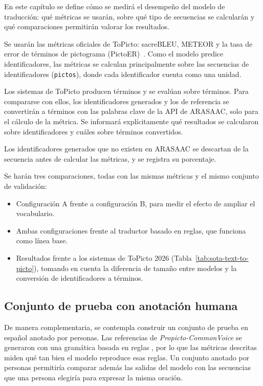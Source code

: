 En este capítulo se define cómo se medirá el desempeño del modelo de traducción: qué métricas se usarán, sobre qué tipo de secuencias se calcularán y qué comparaciones permitirán valorar los resultados.

Se usarán las métricas oficiales de ToPicto: sacreBLEU, METEOR y la tasa de error de términos de pictograma (PictoER)~\citep{Hjuler2026}. Como el modelo predice identificadores, las métricas se calculan principalmente sobre las secuencias de identificadores (\texttt{pictos}), donde cada identificador cuenta como una unidad.

Los sistemas de ToPicto producen términos y se evalúan sobre términos. Para compararse con ellos, los identificadores generados y los de referencia se convertirán a términos con las palabras clave de la API de ARASAAC, solo para el cálculo de la métrica. Se informará explícitamente qué resultados se calcularon sobre identificadores y cuáles sobre términos convertidos.

Los identificadores generados que no existen en ARASAAC se descartan de la secuencia antes de calcular las métricas, y se registra su porcentaje.

Se harán tres comparaciones, todas con las mismas métricas y el mismo conjunto de validación:
\begin{itemize}
    \item Configuración A frente a configuración B, para medir el efecto de ampliar el vocabulario.
    \item Ambas configuraciones frente al traductor basado en reglas, que funciona como línea base.
    \item Resultados frente a los sistemas de ToPicto 2026 (Tabla~\ref{tab:sota-text-to-picto}), tomando en cuenta la diferencia de tamaño entre modelos y la conversión de identificadores a términos.
\end{itemize}

\subsection{Conjunto de prueba con anotación humana}
De manera complementaria, se contempla construir un conjunto de prueba en español anotado por personas. Las referencias de \textit{Propicto-CommonVoice} se generaron con una gramática basada en reglas \cite{macaire2024}, por lo que las métricas descritas miden qué tan bien el modelo reproduce esas reglas. Un conjunto anotado por personas permitiría comparar además las salidas del modelo con las secuencias que una persona elegiría para expresar la misma oración.


